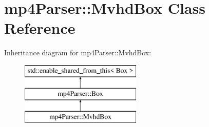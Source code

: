 \hypertarget{classmp4_parser_1_1_mvhd_box}{}\section{mp4\+Parser\+::Mvhd\+Box Class Reference}
\label{classmp4_parser_1_1_mvhd_box}
Inheritance diagram for mp4\+Parser\+::Mvhd\+Box\+:\begin{figure}[H]
\begin{center}
\leavevmode
\includegraphics[height=3.000000cm]{classmp4_parser_1_1_mvhd_box}
\end{center}
\end{figure}
